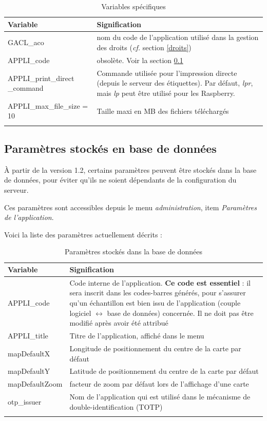 \begin{longtable}{|p{4cm}|p{11cm}|}
\hline
\textbf{Variable} & \textbf{Signification} \\
\hline
\endhead
GACL\_aco & nom du code de l'application utilisé dans la gestion des droits (\textit{cf.} section \ref{droits})\\
\hline
APPLI\_code & obsolète. Voir la section \ref{paramdb} \\
\hline
APPLI\_print\_direct \_command & Commande utilisée pour l'impression directe (depuis le serveur des étiquettes). Par défaut, \textit{lpr}, mais \textit{lp} peut être utilisé pour les Raspberry. \\
\hline
APPLI\_max\_file\_size = 10 & Taille maxi en MB des fichiers téléchargés \\
\hline

\caption{Variables spécifiques}
\end{longtable}

\subsection{Paramètres stockés en base de données}
\label{paramdb}

À partir de la version 1.2, certains paramètres peuvent être stockés dans la base de données, pour éviter qu'ils ne soient dépendants de la configuration du serveur.

Ces paramètres sont accessibles depuis le menu \textit{administration}, item \textit{Paramètres de l'application}.

Voici la liste des paramètres actuellement décrits :
\begin{longtable}{|p{4cm}|p{11cm}|}
\hline
\textbf{Variable} & \textbf{Signification} \\
\hline
\endhead
APPLI\_code & Code interne de l'application. \textbf{Ce code est essentiel} : il sera inscrit dans les codes-barres générés, pour s'assurer qu'un échantillon est bien issu de l'application (couple logiciel $\leftrightarrow$ base de données) concernée. Il ne doit pas être modifié après avoir été attribué\\
\hline
APPLI\_title & Titre de l'application, affiché dans le menu \\
\hline
mapDefaultX & Longitude de positionnement du centre de la carte par défaut \\
\hline
mapDefaultY & Latitude de positionnement du centre de la carte par défaut \\
\hline
mapDefaultZoom & facteur de zoom par défaut lors de l'affichage d'une carte \\
\hline
otp\_issuer & Nom de l'application qui est utilisé dans le mécanisme de double-identification (TOTP) \\
\hline
\caption{Paramètres stockés dans la base de données}
\end{longtable}


